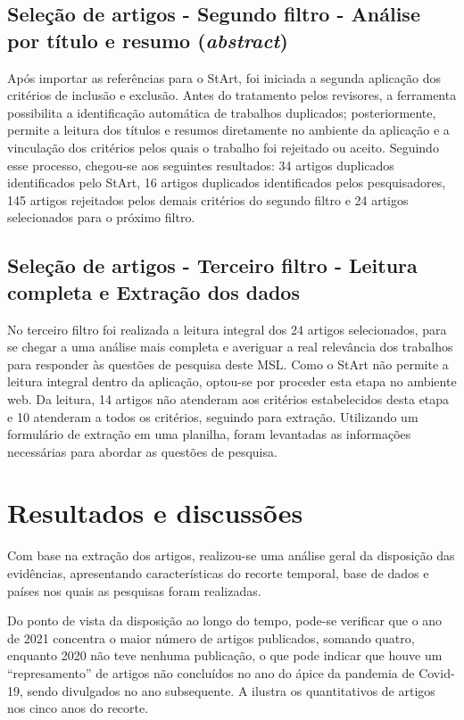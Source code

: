 \documentclass[portuguese]{textolivre}
\begin{document}
\subsection{Seleção de artigos - Segundo filtro - Análise por título e resumo (\textit{abstract})}\label{sec-resumo}
Após importar as referências para o StArt, foi iniciada a segunda aplicação dos critérios de inclusão e exclusão. Antes do tratamento pelos revisores, a ferramenta possibilita a identificação automática de trabalhos duplicados; posteriormente, permite a leitura dos títulos e resumos diretamente no ambiente da aplicação e a vinculação dos critérios pelos quais o trabalho foi rejeitado ou aceito. Seguindo esse processo, chegou-se aos seguintes resultados: 34 artigos duplicados identificados pelo StArt, 16 artigos duplicados identificados pelos pesquisadores, 145 artigos rejeitados pelos demais critérios do segundo filtro e 24 artigos selecionados para o próximo filtro.

\subsection{Seleção de artigos - Terceiro filtro - Leitura completa e Extração dos dados}\label{sec-secoes}
No terceiro filtro foi realizada a leitura integral dos 24 artigos selecionados, para se chegar a uma análise mais completa e averiguar a real relevância dos trabalhos para responder às questões de pesquisa deste MSL. Como o StArt não permite a leitura integral dentro da aplicação, optou-se por proceder esta etapa no ambiente web. Da leitura, 14 artigos não atenderam aos critérios estabelecidos desta etapa e 10 atenderam a todos os critérios, seguindo para extração. Utilizando um formulário de extração em uma planilha, foram levantadas as informações necessárias para abordar as questões de pesquisa.

\section{Resultados e discussões}\label{sec-format-simple}
Com base na extração dos artigos, realizou-se uma análise geral da disposição das evidências, apresentando características do recorte temporal, base de dados e países nos quais as pesquisas foram realizadas.

Do ponto de vista da disposição ao longo do tempo, pode-se verificar que o ano de 2021 concentra o maior número de artigos publicados, somando quatro, enquanto 2020 não teve nenhuma publicação, o que pode indicar que houve um “represamento” de artigos não concluídos no ano do ápice da pandemia de Covid-19, sendo divulgados no ano subsequente. A  ilustra os quantitativos de artigos nos cinco anos do recorte.
\end{document}

